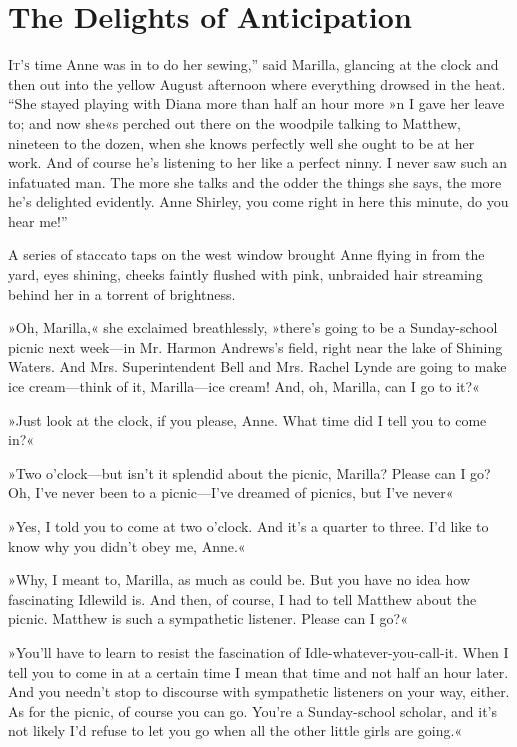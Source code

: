 \chapter{The Delights of Anticipation}

\lettrine[ante=“,lines=4]{I}{t’s} time Anne was in to do her sewing,” said Marilla, glancing at the clock and then out into the yellow August afternoon where everything drowsed in the heat. “She stayed playing with Diana more than half an hour more »n I gave her leave to; and now she«s perched out there on the woodpile talking to Matthew, nineteen to the dozen, when she knows perfectly well she ought to be at her work. And of course he’s listening to her like a perfect ninny. I never saw such an infatuated man. The more she talks and the odder the things she says, the more he’s delighted evidently. Anne Shirley, you come right in here this minute, do you hear me!”

A series of staccato taps on the west window brought Anne flying in from the yard, eyes shining, cheeks faintly flushed with pink, unbraided hair streaming behind her in a torrent of brightness.

»Oh, Marilla,« she exclaimed breathlessly, »there’s going to be a Sunday-school picnic next week—in Mr. Harmon Andrews’s field, right near the lake of Shining Waters. And Mrs. Superintendent Bell and Mrs. Rachel Lynde are going to make ice cream—think of it, Marilla—ice cream! And, oh, Marilla, can I go to it?«

»Just look at the clock, if you please, Anne. What time did I tell you to come in?«

»Two o’clock—but isn’t it splendid about the picnic, Marilla? Please can I go? Oh, I’ve never been to a picnic—I’ve dreamed of picnics, but I’ve never\longdash«

»Yes, I told you to come at two o’clock. And it’s a quarter to three. I’d like to know why you didn’t obey me, Anne.«

»Why, I meant to, Marilla, as much as could be. But you have no idea how fascinating Idlewild is. And then, of course, I had to tell Matthew about the picnic. Matthew is such a sympathetic listener. Please can I go?«

»You’ll have to learn to resist the fascination of Idle-whatever-you-call-it. When I tell you to come in at a certain time I mean that time and not half an hour later. And you needn’t stop to discourse with sympathetic listeners on your way, either. As for the picnic, of course you can go. You’re a Sunday-school scholar, and it’s not likely I’d refuse to let you go when all the other little girls are going.«

